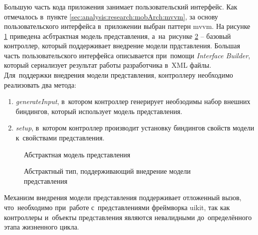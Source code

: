 \subsubsection{}
\label{sec:development:client:vc}

Большую часть кода приложения занимает пользовательский интерфейс. Как отмечалось в~пункте \ref{sec:analysis:research:mobArch:mvvm}, за основу пользовательского интерфейса в~приложении выбран паттерн \gls{mvvm}. 
На рисунке \ref{sec:development:client:vc:code:vm} приведена асбтрактная модель представления, а~на~рисунке \ref{sec:development:client:vc:code:vc} -- базовый контроллер, который поддерживает внедрение модели прдставления. Большая часть пользовательского интерфейса описывается при~помощи \textit{Interface Builder}, который сериализует результат работы разработчика в~XML файлы. Для~поддержки внедрения модели представления, контроллеру необходимо реализовать два метода: 
\begin{enumerate}
	\item \textit{generateInput}, в~котором контроллер генерирует необзодимы набор внешних биндингов, который использует модель представления.
	\item \textit{setup}, в~котором контроллер производит установку биндингов свойств модели к~свойствами представления.
\end{enumerate}

\begin{figure}[h]
	
   \caption{Абстрактная модель представления}
   \label{sec:development:client:vc:code:vm}
\end{figure}

\begin{figure}[h]
	
   \caption{Абстрактный тип, поддерживающий внедрение модели представления}
   \label{sec:development:client:vc:code:vc}
\end{figure}

Механизм внедрения модели представления поддерживает отложенный вызов, что~необходимо при~работе с~представлениями фреймворка \gls{uikit}, так как контроллеры и~объекты представления являются невалидными до~определённого этапа жизненного цикла.